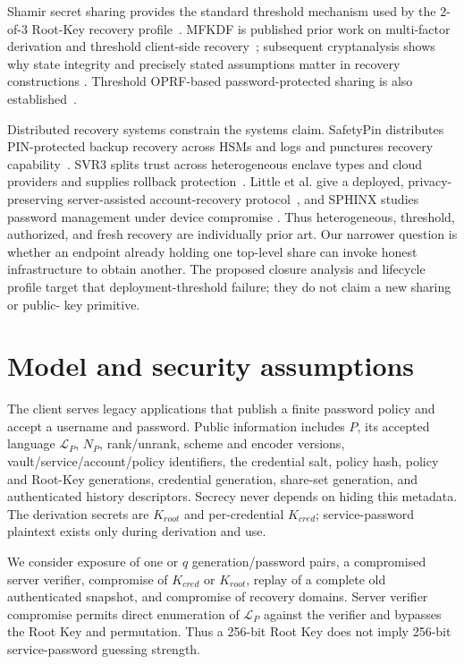 \documentclass[preprint,12pt]{elsarticle}
\newcommand{\Lang}{\mathcal{L}}
\begin{document}
Shamir secret sharing provides the standard threshold mechanism used by the
2-of-3 Root-Key recovery profile~\cite{shamir1979share}. MFKDF is
published prior work on multi-factor derivation and threshold client-side
recovery~\cite{nair2023mfkdf}; subsequent cryptanalysis shows why state
integrity and precisely stated assumptions matter in recovery constructions
\cite{scarlata2024mfkdf}. Threshold OPRF-based password-protected sharing is
also established~\cite{jarecki2017toppss}.

Distributed recovery systems constrain the systems claim. SafetyPin distributes
PIN-protected backup recovery across HSMs and logs and punctures recovery
capability~\cite{dauterman2020safetypin}. SVR3 splits trust across
heterogeneous enclave types and cloud providers and supplies rollback
protection~\cite{connell2024svr3}. Little et al. give a deployed, privacy-
preserving server-assisted account-recovery protocol~\cite{little2024recovery},
and SPHINX studies password management under device compromise
\cite{shirvanian2019sphinx}. Thus heterogeneous, threshold, authorized, and
fresh recovery are individually prior art. Our narrower question is whether an
endpoint already holding one top-level share can invoke honest infrastructure
to obtain another. The proposed closure analysis and lifecycle profile target
that deployment-threshold failure; they do not claim a new sharing or public-
key primitive.



\section{Model and security assumptions}

The client serves legacy applications that publish a finite password policy
and accept a username and password. Public information includes $P$, its
accepted language $\Lang_P$, $N_P$, rank/unrank, scheme and encoder versions,
vault/service/account/policy identifiers, the credential salt, policy hash,
policy and Root-Key generations, credential generation, share-set generation,
and authenticated history descriptors. Secrecy never depends on hiding this
metadata. The derivation secrets are $K_{root}$ and per-credential $K_{cred}$;
service-password plaintext exists only during derivation and use.

We consider exposure of one or $q$ generation/password pairs, a compromised
server verifier, compromise of $K_{cred}$ or $K_{root}$, replay of a complete
old authenticated snapshot, and compromise of recovery domains. Server
verifier compromise permits direct enumeration of $\Lang_P$ against the
verifier and bypasses the Root Key and permutation. Thus a 256-bit Root Key
does not imply 256-bit service-password guessing strength.
\end{document}
